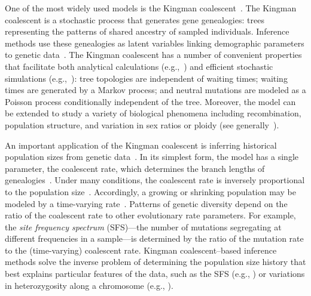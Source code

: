 \documentclass[11pt, letterpaper]{article}   	%
\begin{document}
One of the most widely used models is the Kingman coalescent~\autocite{Kingman1982, Kingman1982a, Hudson1983, Tajima1983}.
The Kingman coalescent is a stochastic process that generates gene genealogies: trees representing the patterns of shared ancestry of sampled individuals.
Inference methods use these genealogies as latent variables linking demographic parameters to genetic data~\autocite{RosenbergNordborg2002}.
The Kingman coalescent has a number of convenient properties that facilitate both analytical calculations (e.g.,~\cite{Tajima1989}) and efficient stochastic simulations (e.g.,~\cite{Hudson2002}): tree topologies are independent of waiting times; waiting times are generated by a Markov process; and neutral mutations are modeled as a Poisson process conditionally independent of the tree.
Moreover, the model can be extended to study a variety of biological phenomena including recombination, population structure, and variation in sex ratios or ploidy (see generally~\cite{Wakeley2009}).

An important application of the Kingman coalescent is inferring historical population sizes from genetic data~\autocite{SchraiberAkey2015}.
In its simplest form, the model has a single parameter, the coalescent rate, which determines the branch lengths of genealogies~\autocite{Kingman1982}.
Under many conditions, the coalescent rate is inversely proportional to the population size~\autocite{Kingman1982a}.
Accordingly, a growing or shrinking population may be modeled by a time-varying rate~\autocite{GriffithsTavare1994, GriffithsTavare1998}.
Patterns of genetic diversity depend on the ratio of the coalescent rate to other evolutionary rate parameters.
For example, the \emph{site frequency spectrum} (SFS)---the number of mutations segregating at different frequencies in a sample---is determined by the ratio of the mutation rate to the (time-varying) coalescent rate.
Kingman coalescent--based inference methods solve the inverse problem of determining the population size history that best explains particular features of the data, such as the SFS (e.g., \cite{BhaskarEtAl2015}) or variations in heterozygosity along a chromosome (e.g., \cite{LiDurbin2011}).
\end{document}
